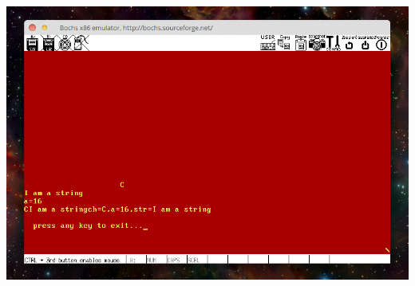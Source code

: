 \documentclass[a4paper]{article}
\begin{document}
{{{\center\includegraphics[scale=0.4]{Illustrations/usr1_over.png}}\\\\

}}
\end{document}
